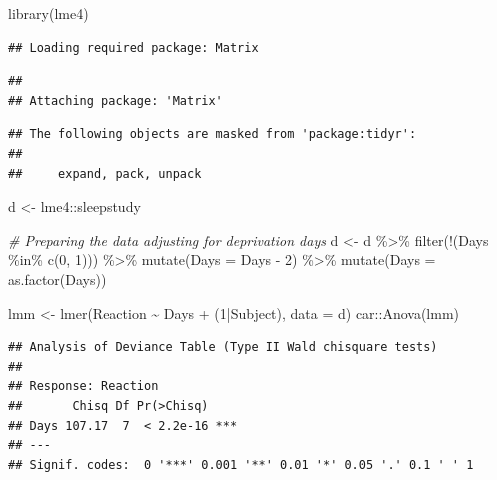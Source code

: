 \documentclass[
]{book}
\newenvironment{Shaded}{\begin{snugshade}}{\end{snugshade}}
\newcommand{\AttributeTok}[1]{\textcolor[rgb]{0.77,0.63,0.00}{#1}}
\newcommand{\CommentTok}[1]{\textcolor[rgb]{0.56,0.35,0.01}{\textit{#1}}}
\newcommand{\DecValTok}[1]{\textcolor[rgb]{0.00,0.00,0.81}{#1}}
\newcommand{\FunctionTok}[1]{\textcolor[rgb]{0.00,0.00,0.00}{#1}}
\newcommand{\NormalTok}[1]{#1}
\newcommand{\OtherTok}[1]{\textcolor[rgb]{0.56,0.35,0.01}{#1}}
\newcommand{\SpecialCharTok}[1]{\textcolor[rgb]{0.00,0.00,0.00}{#1}}
\begin{document}
\begin{Shaded}
\begin{Highlighting}[]
\FunctionTok{library}\NormalTok{(lme4)}
\end{Highlighting}
\end{Shaded}

\begin{verbatim}
## Loading required package: Matrix
\end{verbatim}

\begin{verbatim}
## 
## Attaching package: 'Matrix'
\end{verbatim}

\begin{verbatim}
## The following objects are masked from 'package:tidyr':
## 
##     expand, pack, unpack
\end{verbatim}

\begin{Shaded}
\begin{Highlighting}[]
\NormalTok{d }\OtherTok{\textless{}{-}}\NormalTok{ lme4}\SpecialCharTok{::}\NormalTok{sleepstudy}

\CommentTok{\# Preparing the data adjusting for deprivation days}
\NormalTok{d }\OtherTok{\textless{}{-}}\NormalTok{ d }\SpecialCharTok{\%\textgreater{}\%} 
  \FunctionTok{filter}\NormalTok{(}\SpecialCharTok{!}\NormalTok{(Days }\SpecialCharTok{\%in\%} \FunctionTok{c}\NormalTok{(}\DecValTok{0}\NormalTok{, }\DecValTok{1}\NormalTok{))) }\SpecialCharTok{\%\textgreater{}\%} 
  \FunctionTok{mutate}\NormalTok{(}\AttributeTok{Days =}\NormalTok{ Days }\SpecialCharTok{{-}} \DecValTok{2}\NormalTok{) }\SpecialCharTok{\%\textgreater{}\%} 
  \FunctionTok{mutate}\NormalTok{(}\AttributeTok{Days =} \FunctionTok{as.factor}\NormalTok{(Days))}

\NormalTok{lmm }\OtherTok{\textless{}{-}} \FunctionTok{lmer}\NormalTok{(Reaction }\SpecialCharTok{\textasciitilde{}}\NormalTok{ Days }\SpecialCharTok{+}\NormalTok{ (}\DecValTok{1}\SpecialCharTok{|}\NormalTok{Subject), }\AttributeTok{data =}\NormalTok{ d)}
\NormalTok{car}\SpecialCharTok{::}\FunctionTok{Anova}\NormalTok{(lmm)}
\end{Highlighting}
\end{Shaded}

\begin{verbatim}
## Analysis of Deviance Table (Type II Wald chisquare tests)
## 
## Response: Reaction
##       Chisq Df Pr(>Chisq)    
## Days 107.17  7  < 2.2e-16 ***
## ---
## Signif. codes:  0 '***' 0.001 '**' 0.01 '*' 0.05 '.' 0.1 ' ' 1
\end{verbatim}
\end{document}
